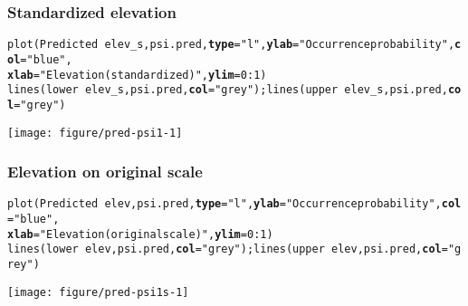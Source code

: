 \documentclass[color=usenames,dvipsnames]{beamer}\usepackage[]{graphicx}\usepackage[]{xcolor}
\makeatletter
\newcommand{\hlnum}[1]{\textcolor[rgb]{0.69,0.494,0}{#1}}%
\newcommand{\hlsng}[1]{\textcolor[rgb]{0.749,0.012,0.012}{#1}}%
\newcommand{\hlopt}[1]{\textcolor[rgb]{0,0,0}{#1}}%
\newcommand{\hldef}[1]{\textcolor[rgb]{0,0,0}{#1}}%
\newcommand{\hlkwc}[1]{\textcolor[rgb]{0,0,0}{\textbf{#1}}}%
\newcommand{\hlkwd}[1]{\textcolor[rgb]{0.004,0.004,0.506}{#1}}%
\newenvironment{kframe}{%
 \def\at@end@of@kframe{}%
 \ifinner\ifhmode%
  \def\at@end@of@kframe{\end{minipage}}%
  \begin{minipage}{\columnwidth}%
 \fi\fi%
 \def\FrameCommand##1{\hskip\@totalleftmargin \hskip-\fboxsep
 \colorbox{shadecolor}{##1}\hskip-\fboxsep
     \hskip-\linewidth \hskip-\@totalleftmargin \hskip\columnwidth}%
 \MakeFramed {\advance\hsize-\width
   \@totalleftmargin\z@ \linewidth\hsize
   \@setminipage}}%
 {\par\unskip\endMakeFramed%
 \at@end@of@kframe}
\newenvironment{knitrout}{}{} %
\makeatother
\begin{document}
\begin{frame}[fragile]
  \frametitle{Standardized elevation}
\begin{knitrout}\tiny
{}\color{fgcolor}\begin{kframe}
\begin{alltt}
\hlkwd{plot}\hldef{(Predicted} \hlopt{~} \hldef{elev_s, psi.pred,} \hlkwc{type}\hldef{=}\hlsng{"l"}\hldef{,} \hlkwc{ylab}\hldef{=}\hlsng{"Occurrence probability"}\hldef{,} \hlkwc{col}\hldef{=}\hlsng{"blue"}\hldef{,}
     \hlkwc{xlab}\hldef{=}\hlsng{"Elevation (standardized)"}\hldef{,} \hlkwc{ylim}\hldef{=}\hlnum{0}\hlopt{:}\hlnum{1}\hldef{)}
\hlkwd{lines}\hldef{(lower} \hlopt{~} \hldef{elev_s, psi.pred,} \hlkwc{col}\hldef{=}\hlsng{"grey"}\hldef{);} \hlkwd{lines}\hldef{(upper} \hlopt{~} \hldef{elev_s, psi.pred,} \hlkwc{col}\hldef{=}\hlsng{"grey"}\hldef{)}
\end{alltt}
\end{kframe}

{\centering \texttt{[image: figure/pred-psi1-1]} 

}


\end{knitrout}
\end{frame}




\begin{frame}[fragile]
  \frametitle{Elevation on original scale}
\begin{knitrout}\tiny
{}\color{fgcolor}\begin{kframe}
\begin{alltt}
\hlkwd{plot}\hldef{(Predicted} \hlopt{~} \hldef{elev, psi.pred,} \hlkwc{type}\hldef{=}\hlsng{"l"}\hldef{,} \hlkwc{ylab}\hldef{=}\hlsng{"Occurrence probability"}\hldef{,} \hlkwc{col}\hldef{=}\hlsng{"blue"}\hldef{,}
     \hlkwc{xlab}\hldef{=}\hlsng{"Elevation (original scale)"}\hldef{,} \hlkwc{ylim}\hldef{=}\hlnum{0}\hlopt{:}\hlnum{1}\hldef{)}
\hlkwd{lines}\hldef{(lower} \hlopt{~} \hldef{elev, psi.pred,} \hlkwc{col}\hldef{=}\hlsng{"grey"}\hldef{);} \hlkwd{lines}\hldef{(upper} \hlopt{~} \hldef{elev, psi.pred,} \hlkwc{col}\hldef{=}\hlsng{"grey"}\hldef{)}
\end{alltt}
\end{kframe}

{\centering \texttt{[image: figure/pred-psi1s-1]} 

}


\end{knitrout}
\end{frame}
\end{document}
